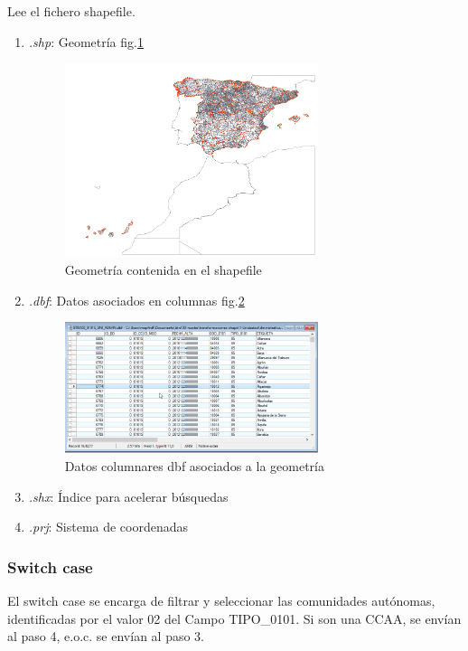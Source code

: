Lee el fichero shapefile.
\begin{enumerate}
    \item \textit{.shp}: Geometría fig.\ref{fig:shapefile}

        \begin{figure}[h!]
            \includegraphics[width=0.7\textwidth]{images/shapefile.png}
            \centering
            \caption{Geometría contenida en el shapefile}
            \label{fig:shapefile}
        \end{figure}

    \item \textit{.dbf}: Datos asociados en columnas fig.\ref{fig:dbf}

        \begin{figure}[h!]
            \includegraphics[width=0.7\textwidth]{images/dbf.png}
            \centering
            \caption{Datos columnares dbf asociados a la geometría}
            \label{fig:dbf}
        \end{figure}

    \item \textit{.shx}: Índice para acelerar búsquedas
    \item \textit{.prj}: Sistema de coordenadas
\end{enumerate}

\subsubsection{Switch case}
El switch case se encarga de filtrar y seleccionar las comunidades autónomas, identificadas por el valor 02 del
Campo TIPO\_0101. Si son una CCAA, se envían al paso 4, e.o.c. se envían al paso 3.


